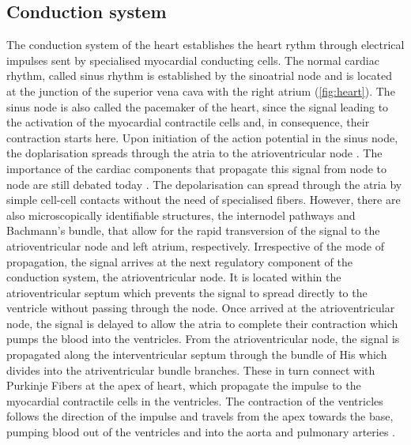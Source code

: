 \subsection{Conduction system}
The conduction system of the heart establishes the heart rythm through electrical impulses sent by specialised myocardial conducting cells. The normal cardiac rhythm, called sinus rhythm is established by the sinoatrial node and is located at the junction of the superior vena cava with the right atrium (\cref{fig:heart}). The sinus node is also called the pacemaker of the heart, since the signal leading to the activation of the myocardial contractile cells and, in consequence, their contraction starts here. Upon initiation of the action potential in the sinus node, the doplarisation spreads through the atria to the atrioventricular node . The importance of the cardiac components that propagate this signal from node to node are still debated today \citep{Iaizzo2005,Anderson2009}. The depolarisation can spread through the atria by simple cell-cell contacts without the need of specialised fibers. However, there are also microscopically identifiable structures, the internodel pathways and Bachmann's bundle, that allow for the rapid transversion of the signal to the atrioventricular node and left atrium, respectively. Irrespective of the mode of propagation, the signal arrives at the next regulatory component of the conduction system, the atrioventricular node. It is located within the atrioventricular septum which prevents the signal to spread directly to the ventricle without passing through the node. Once arrived at the atrioventricular node, the signal is delayed to allow the atria to complete their contraction which pumps the blood into the ventricles. From the atrioventricular node, the signal is propagated along the interventricular septum through the bundle of His which divides into the atriventricular bundle branches. These in turn connect with Purkinje Fibers at the apex of heart, which propagate the impulse to the myocardial contractile cells in the ventricles. The contraction of the ventricles follows the direction of the impulse and travels from the apex towards the base, pumping blood out of the ventricles and into the aorta and pulmonary arteries \citep{Iaizzo2005,Sigg2010}.  

